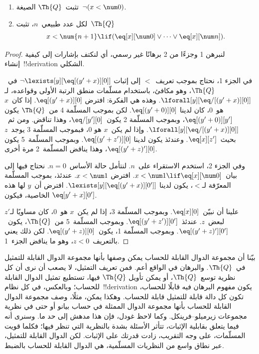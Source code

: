 \documentclass[../../../include/open-logic-section]{subfiles}
\begin{document}
\begin{lem}
\begin{enumerate}
\item تثبت~$\Th{Q}$ الصيغة~$\lnot (x < \num 0)$.
\item لكل عدد طبيعي~$n$، تثبت~$\Th{Q}$
\[
x < \num {n+1} \lif (\eq[x][\num 0] \lor \dots \lor \eq[x][\num n]).
\]
\end{enumerate}
\end{lem}

\begin{proof}
لنبرهن 1 وجزءًا من 2 برهانًا غير رسمي، أي لنكتف بإشارات إلى كيفية
إنشاء~!!{derivation} الشكلي.

في الجزء 1، نحتاج بموجب تعريف~$<$ إلى إثبات
$\lnot \lexists[y][\eq[(y'+x)][0]]$ في~$\Th{Q}$، وهو مكافئ، باستخدام
مسلّمات منطق الرتبة الأولى وقواعده، لـ
$\lforall[y][\eq/[(y' + x)][0]]$. وهذه هي الفكرة: افترض
$\eq[(y'+x)][0]$. إذا كان~$x$ هو~$0$، كان لدينا
$\eq[(y' + 0)][0]$. لكن بموجب المسلّمة 4 من~$\Th{Q}$ يكون
$\eq[(y' + 0)][y']$، وبموجب المسلّمة 2 يكون~$\eq/[y'][0]$، وهذا
تناقض. ومن ثم~$\lforall[y][\eq/[(y' +x)][0]]$. وإذا لم يكن~$x$ هو
$0$، فبموجب المسلّمة 3 يوجد~$z$ بحيث~$\eq[x][z']$. وعندئذ يكون لدينا
$\eq[(y' + z')][0]$. وبموجب المسلّمة~5 يكون
$\eq[(y' + z)'][0]$، وهذا يناقض المسلّمة~2 مرة أخرى.

وفي الجزء 2، استخدم الاستقراء على~$n$. لنتأمل حالة الأساس~$n =0$.
نحتاج فيها إلى بيان~$x < \num 1 \lif \eq[x][\num 0]$. افترض
$x < \num 1$. عندئذ، بموجب المسلّمة المعرّفة لـ$<$، يكون لدينا
$\lexists[y][\eq[(y'+x)][0']]$. افترض أن~$y$ لها هذه الخاصية، فيكون
$\eq[y'+x][0']$.

علينا أن نبيّن~$\eq[x][0]$. وبموجب المسلّمة 3، إذا لم يكن~$x$ هو~$0$،
كان مساويًا لـ$z'$ لبعض~$z$. عندئذ~$\eq[(y' + z')][0']$. وبموجب
المسلّمة~5 من~$\Th{Q}$، يكون~$\eq[(y'+z)'][0']$. وبموجب المسلّمة 1،
يكون~$\eq[(y' + z)][0]$. لكن ذلك يعني بالتعريف~$z < 0$، وهو ما يناقض
الجزء~1.
\end{proof}

\begin{explain}
بيّنا أن مجموعة الدوال القابلة للحساب يمكن وصفها بأنها مجموعة الدوال
القابلة للتمثيل في~$\Th{Q}$. والبرهان في الواقع أعم. فمن تعريف
التمثيل، لا يصعب أن نرى أن كل نظرية توسع~$\Th{Q}$، أو يمكن تأويل
$\Th{Q}$ فيها، تستطيع تمثيل الدوال القابلة للحساب؛ وبالعكس، في كل
نظام~!!{derivation} يكون مفهوم البرهان فيه قابلًا للحساب، تكون كل دالة
قابلة للتمثيل قابلة للحساب. وهكذا يمكن، مثلًا، وصف مجموعة الدوال
القابلة للحساب بأنها مجموعة الدوال الممثلة في حساب بيانو أو حتى في
نظرية مجموعات زيرميلو--فرينكل. وكما لاحظ غودل، فإن هذا مدهش إلى حد ما.
وسنرى أنه فيما يتعلق بقابلية الإثبات، تتأثر الأسئلة بشدة بالنظرية التي
تنظر فيها؛ فكلما قويت المسلّمات، على وجه التقريب، زادت قدرتك على
الإثبات. لكن الدوال القابلة للتمثيل، عبر نطاق واسع من النظريات
المسلّمية، هي الدوال القابلة للحساب بالضبط.
\end{explain}
\end{document}

